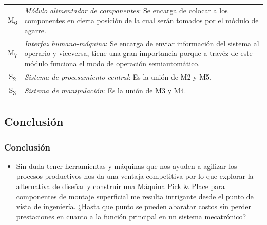 \begin{frame}
\begin{minipage}{\textwidth}
\begin{minipage}{0.45\textwidth}
{\begin{tabular}{c p{50mm}}
						M\textsubscript{6} & \textit{Módulo alimentador de componentes}: Se encarga de colocar a los componentes en cierta posición de la cual serán tomados por el módulo de agarre. \\
						M\textsubscript{7} & \textit{Interfaz humano-máquina}: Se encarga de enviar información del sistema al operario  y viceversa, tiene una gran importancia porque a travéz de este módulo funciona el modo de operación semiautomático. \\
						S\textsubscript{2} & \textit{Sistema de procesamiento central}: Es la unión de M2 y M5. \\
						S\textsubscript{3} & \textit{Sistema de manipulación}: Es la unión de M3 y M4.
				\end{tabular}}
			\end{minipage}
		\end{minipage}
	\end{frame}
	\begin{frame}
		\section{Conclusión}
		\frametitle{Conclusión}
		\begin{itemize}
			\item Sin duda tener herramientas y máquinas que nos ayuden a agilizar los procesos productivos nos da una ventaja competitiva por lo que explorar la alternativa de diseñar y construir una Máquina Pick \& Place para componentes de montaje superficial me resulta intrigante desde el punto de vista de ingeniería. ¿Hasta que punto se pueden abaratar costos sin perder prestaciones en cuanto a la función principal en un sistema mecatrónico?
		\end{itemize}
	\end{frame}

 